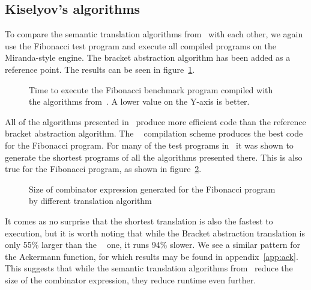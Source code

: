 \documentclass[conference]{IEEEtran}
\DeclareMathOperator{\strict}{strict}
\DeclareMathOperator{\lazy}{lazy}
\DeclareMathOperator{\lazyeta}{lazy_\eta}
\DeclareMathOperator{\linear}{linear}
\begin{document}
\subsection{Kiselyov's algorithms}
To compare the semantic translation algorithms from~\cite{kiselyov_lambda_2018} with each other, we again use the Fibonacci test program and execute all compiled programs on the Miranda-style engine.
The bracket abstraction algorithm has been added as a reference point.
The results can be seen in figure~\ref{fig:bracket-vs-kiselyov}.

\begin{figure}
    
    \centering
    \caption{Time to execute the Fibonacci benchmark program compiled with the algorithms from~\cite{kiselyov_lambda_2018}. A lower value on the Y-axis is better.}
    \label{fig:bracket-vs-kiselyov}
\end{figure}

All of the algorithms presented in~\cite{kiselyov_lambda_2018} produce more efficient code than the reference bracket abstraction algorithm.
The $\lazyeta$ compilation scheme produces the best code for the Fibonacci program.
For many of the test programs in~\cite{kiselyov_lambda_2018} it was shown to generate the shortest programs of all the algorithms presented there.
This is also true for the Fibonacci program, as shown in figure~\ref{fig:fib-sizes}.

\begin{figure}
    \centering
    \caption{Size of combinator expression generated for the Fibonacci program by different translation algorithm}
    \label{fig:fib-sizes}
\end{figure}


It comes as no surprise that the shortest translation is also the fastest to execution, but it is worth noting that while the Bracket abstraction translation is only 55\% larger than the $\lazyeta$ one, it runs 94\% slower.
We see a similar pattern for the Ackermann function, for which results may be found in appendix~\ref{app:ack}.
This suggests that while the semantic translation algorithms from~\cite{kiselyov_lambda_2018} reduce the size of the combinator expression, they reduce runtime even further.
\end{document}
